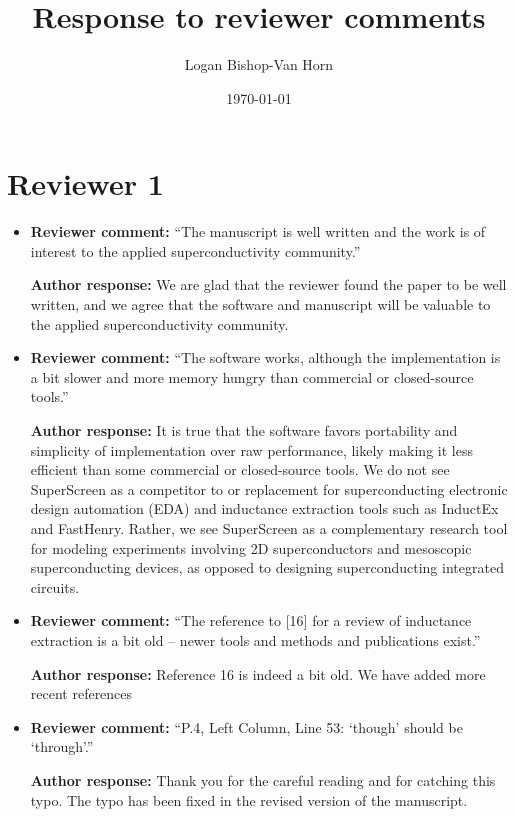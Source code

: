 \documentclass{article} %
\title{Response to reviewer comments}
\author{Logan Bishop-Van Horn}
\date{\today}
\begin{document}
\maketitle

\section{Reviewer 1}

\begin{itemize}
    \item{
    {\bf Reviewer comment:} ``The manuscript is well written and the work is of interest to the applied superconductivity community.''
    
    {\bf Author response:} We are glad that the reviewer found the paper to be well written, and we agree that the software and manuscript will be valuable to the applied superconductivity community.
    }
    \item{
    {\bf Reviewer comment:} ``The software works, although the implementation is a bit slower and more memory hungry than commercial or closed-source tools.''
    
    {\bf Author response:} It is true that the software favors portability and simplicity of implementation over raw performance, likely making it less efficient than some commercial or closed-source tools. We do not see SuperScreen as a competitor to or replacement for superconducting electronic design automation (EDA) and inductance extraction tools such as InductEx and FastHenry. Rather, we see SuperScreen as a complementary research tool for modeling experiments involving 2D superconductors and mesoscopic superconducting devices, as opposed to designing superconducting integrated circuits. 
    }
    \item{
    {\bf Reviewer comment:} ``The reference to [16] for a review of inductance extraction is a bit old -- newer tools and methods and publications exist.''
    
    {\bf Author response:} Reference 16 is indeed a bit old. We have added more recent references
    }
    \item{
    {\bf Reviewer comment:} ``P.4, Left Column, Line 53: `though' should be `through'.''
    
    {\bf Author response:} Thank you for the careful reading and for catching this typo. The typo has been fixed in the revised version of the manuscript.
    }
\end{itemize}
\end{document}
